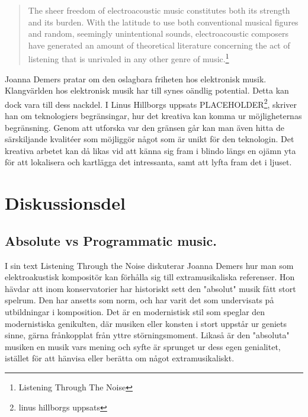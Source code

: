 \documentclass{article}
\begin{document}
\begin{quote}
The sheer freedom of electroacoustic music constitutes both its strength and its burden. With the
latitude to use both conventional musical figures and random, seemingly unintentional sounds,
electroacoustic composers have generated an amount of theoretical literature concerning the act of
listening that is unrivaled in any other genre of music.\footnote{Listening Through The Noise}
\end{quote}


Joanna Demers pratar om den oslagbara friheten hos elektronisk musik. Klangvärlden hos elektronisk musik har
till synes oändlig potential. Detta kan dock vara till dess nackdel. I Linus Hillborgs uppsats
PLACEHOLDER\footnote{linus hillborgs uppsats}, skriver han om teknologiers begränsingar, hur det kreativa
kan komma ur möjligheternas begränsning. Genom att utforska var den gränsen går kan man även hitta de
särskiljande kvalitéer som möjliggör något som är unikt för den teknologin. Det kreativa arbetet kan då likas
vid att känna sig fram i blindo längs en ojämn yta för att lokalisera och kartlägga det intressanta, samt att
lyfta fram det i ljuset. 





\section{Diskussionsdel}
\subsection{Absolute vs Programmatic music.}


I sin text Listening Through the Noise diskuterar Joanna Demers hur man som elektroakustisk kompositör kan
förhålla sig till extramusikaliska referenser. Hon hävdar att inom konservatorier har historiskt sett den 
"absolut" musik fått stort spelrum. Den har ansetts som norm, och har varit det som undervisats på
utbildningar i komposition. Det är en modernistisk stil som speglar den modernistiska genikulten, där musiken
eller konsten i stort uppstår ur geniets sinne, gärna frånkopplat från yttre störningsmoment. Likaså är den
"absoluta" musiken en musik vars mening och syfte är sprunget ur dess egen genialitet, istället för att
hänvisa eller berätta om något extramusikaliskt. 
\end{document}
